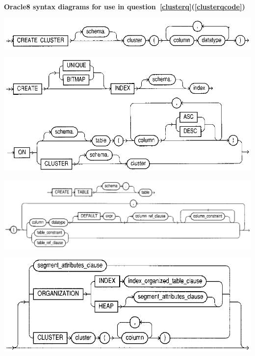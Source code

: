 \documentclass{ouexam}
\begin{document}
\begin{center}
	\textbf{Oracle8 syntax diagrams for use in
	question~\ref{clusterq}(\ref{clusterqcode})}
	
	\bigskip

	\includegraphics{CreateCluster}

	\vfill


	\includegraphics{CreateIndex}


	\vfill

	\includegraphics{CreateTable1}
	
	\bigskip	
	
	\includegraphics{CreateTable2}
\end{center}
\end{document}

